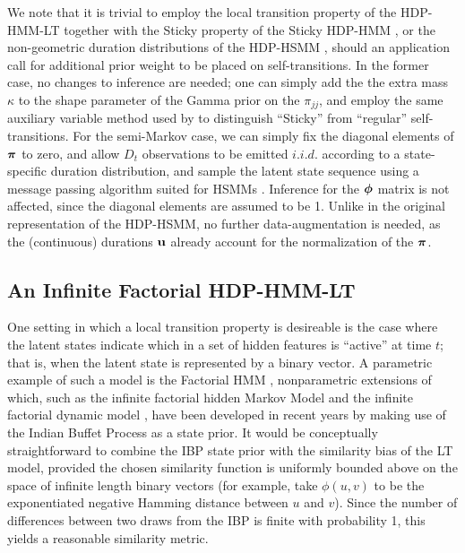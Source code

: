 We note that it is trivial to employ the local transition property of
the HDP-HMM-LT together with the Sticky property of the Sticky
HDP-HMM \cite{fox2008hdp}, or the non-geometric duration distributions of the
HDP-HSMM \cite{johnson2013bayesian}, should an application call for
additional prior weight to be placed on self-transitions.  In the
former case, no changes to inference are needed; one can simply add the
the extra mass $\kappa$ to the shape parameter of the Gamma prior on
the $\pi_{jj}$, and employ the same auxiliary variable method used by
\citeauthor{fox2008hdp} to distinguish ``Sticky'' from ``regular'' self-transitions.
For the semi-Markov case, we can simply fix the diagonal
elements of $\boldsymbol{\pi}$ to zero, and allow $D_t$ observations to be
emitted $i.i.d.$ according to a state-specific duration distribution, and sample the
latent state sequence using a message passing algorithm suited for
HSMMs \cite{johnson2013bayesian}.  Inference for the $\boldsymbol{\phi}$ matrix
is not affected, since the diagonal elements are assumed to be 1.
Unlike in the original representation of the HDP-HSMM, no further
data-augmentation is needed, as the (continuous) durations $\mathbf{u}$ already
account for the normalization of the $\boldsymbol{\pi}$.

\subsection{An Infinite Factorial HDP-HMM-LT}

One setting in which a local transition property is
desireable is the case where the latent states indicate which in a set
of hidden features is ``active'' at time $t$; that is, when the latent
state is represented by a binary vector.  A parametric example of such
a model is the Factorial HMM \cite{ghahramani1997factorial},
nonparametric extensions of which, such as the infinite factorial
hidden Markov Model \cite{gael2009infinite} and the infinite factorial dynamic model
\cite{valera2015infinite}, have been developed in recent years
by making use of the Indian Buffet Process
\cite{ghahramani2005infinite} as a state prior.  It would be
conceptually straightforward to combine the IBP state prior with the
similarity bias of the LT model, provided the chosen similarity
function is uniformly bounded above on the space of infinite length
binary vectors (for example, take $\phi(u,v)$ to be the exponentiated
negative Hamming distance between $u$ and $v$).  Since the number of
differences between two draws from the IBP is finite with probability
1, this yields a reasonable similarity metric.


